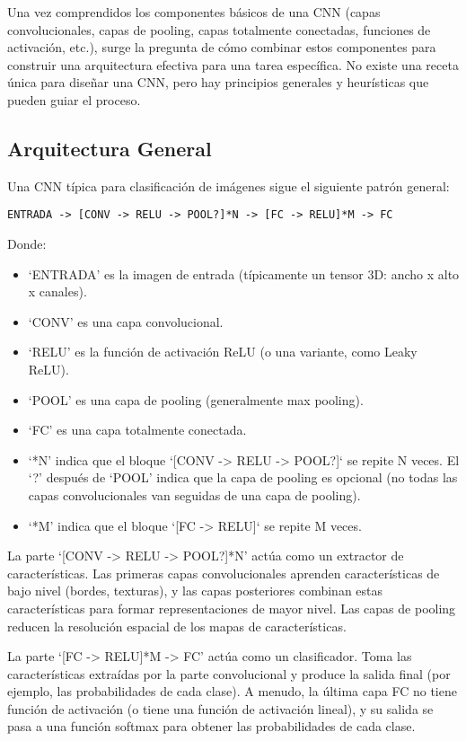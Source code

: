 \documentclass{article}
\begin{document}
Una vez comprendidos los componentes básicos de una CNN (capas convolucionales, capas de pooling, capas totalmente conectadas, funciones de activación, etc.), surge la pregunta de cómo combinar estos componentes para construir una arquitectura efectiva para una tarea específica.  No existe una receta única para diseñar una CNN, pero hay principios generales y heurísticas que pueden guiar el proceso.

\subsection{Arquitectura General}

Una CNN típica para clasificación de imágenes sigue el siguiente patrón general:

\begin{verbatim}
ENTRADA -> [CONV -> RELU -> POOL?]*N -> [FC -> RELU]*M -> FC
\end{verbatim}

Donde:

\begin{itemize}
    \item `ENTRADA' es la imagen de entrada (típicamente un tensor 3D: ancho x alto x canales).
    \item `CONV' es una capa convolucional.
    \item `RELU' es la función de activación ReLU (o una variante, como Leaky ReLU).
    \item `POOL' es una capa de pooling (generalmente max pooling).
    \item `FC' es una capa totalmente conectada.
    \item `*N' indica que el bloque `[CONV -> RELU -> POOL?]` se repite N veces. El `?' después de `POOL' indica que la capa de pooling es opcional (no todas las capas convolucionales van seguidas de una capa de pooling).
    \item `*M' indica que el bloque `[FC -> RELU]` se repite M veces.
\end{itemize}

La parte `[CONV -> RELU -> POOL?]*N' actúa como un extractor de características.  Las primeras capas convolucionales aprenden características de bajo nivel (bordes, texturas), y las capas posteriores combinan estas características para formar representaciones de mayor nivel.  Las capas de pooling reducen la resolución espacial de los mapas de características.

La parte `[FC -> RELU]*M -> FC' actúa como un clasificador.  Toma las características extraídas por la parte convolucional y produce la salida final (por ejemplo, las probabilidades de cada clase).  A menudo, la última capa FC no tiene función de activación (o tiene una función de activación lineal), y su salida se pasa a una función softmax para obtener las probabilidades de cada clase.
\end{document}

